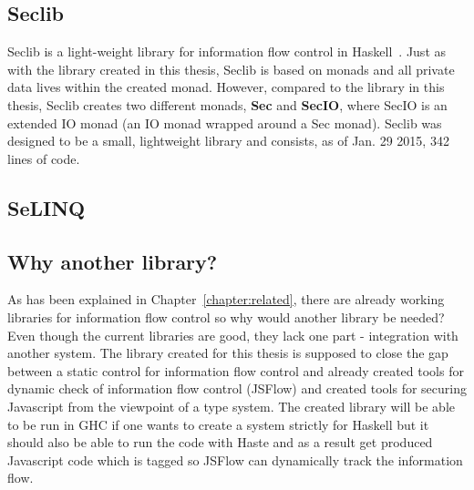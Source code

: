\subsection{Seclib}
Seclib is a light-weight library for information flow control in Haskell~\cite{seclib, seclib_git}. Just as with the library created in this thesis, Seclib is based on monads and all private data lives within the created monad. However, compared to the library in this thesis, Seclib creates two different monads, \textbf{Sec} and \textbf{SecIO}, where SecIO is an extended IO monad (an IO monad wrapped around a Sec monad). Seclib was designed to be a small, lightweight library and consists, as of Jan. 29 2015, 342 lines of code.
\subsection{SeLINQ}

\subsection{Why another library?}
As has been explained in Chapter~\ref{chapter:related}, there are already working libraries for information flow control so why would another library be needed? Even though the current libraries are good, they lack one part - integration with another system. The library created for this thesis is supposed to close the gap between a static control for information flow control and already created tools for dynamic check of information flow control (JSFlow) and created tools for securing Javascript from the viewpoint of a type system. The created library will be able to be run in GHC if one wants to create a system strictly for Haskell but it should also be able to run the code with Haste and as a result get produced Javascript code which is tagged so JSFlow can dynamically track the information flow.

